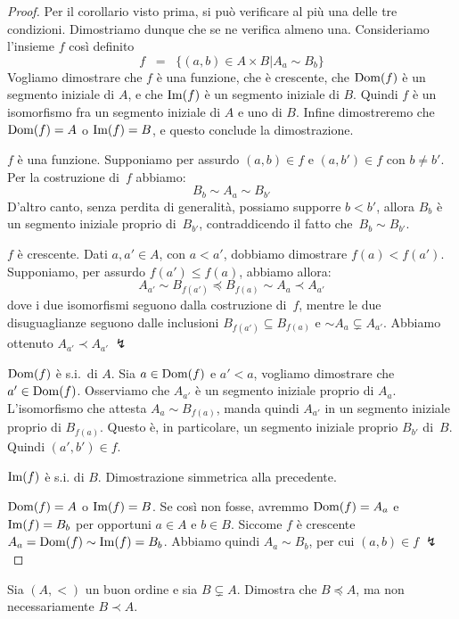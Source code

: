 \begin{proof}
	Per il corollario visto prima, si pu\`o verificare al pi\`u una
delle tre condizioni. Dimostriamo dunque che se ne verifica almeno una.
Consideriamo l'insieme $f$ cos\`i definito
	\[ f \;\;=\;\; \{(a,b) \in A \times B | A_a \sim B_b\}
		\]
	Vogliamo dimostrare che $f$ \`e una funzione, che \`e crescente,
che $\operatorname{Dom}(f)$ \`e un segmento iniziale di $A$, e che $\operatorname{Im}(f)$ \`e un
segmento iniziale di $B$. Quindi $f$ \`e un isomorfismo fra un segmento iniziale di $A$ e uno di $B$.
	Infine dimostreremo che $\operatorname{Dom}(f) = A$ o $\operatorname{Im}(f) = B$, e questo
conclude la dimostrazione.

{\drkblu $f$ \`e una funzione.} Supponiamo per assurdo $(a,b) \in f$ e
$(a,b') \in f$ con $b \ne b'$. Per la costruzione di~$f$ abbiamo:
		\[ B_b \sim A_a \sim B_{b'}
			\]
D'altro canto, senza perdita di generalit\`a, possiamo supporre $b < b'$, allora $B_b$ \`e un
segmento iniziale proprio di~$B_{b'}$, contraddicendo il fatto
che~$B_b\sim B_{b'}$.

{\drkblu $f$ \`e crescente.} Dati $a,a' \in A$, con $a<a'$, dobbiamo dimostrare $f(a) < f(a')$. Supponiamo, per assurdo $f(a') \leq f(a)$, abbiamo allora:
		\[ A_{a'} \sim B_{f(a')} \preceq B_{f(a)} \sim A_a \prec
A_{a'}
			\]
dove i due isomorfismi seguono dalla costruzione di~$f$, mentre le due
disuguaglianze seguono dalle inclusioni $B_{f(a')} \subseteq B_{f(a)}$ e
$\sim A_a\subsetneq  A_{a'}$.
Abbiamo ottenuto $A_{a'}\prec A_{a'}\;\lightning$

{\drkblu $\operatorname{Dom}(f)$ \`e s.i.\ di $A$.} Sia $a \in \operatorname{Dom}(f)$ e $a' < a$,
vogliamo dimostrare che $a' \in \operatorname{Dom}(f)$. Osserviamo che $A_{a'}$ \`e un
segmento iniziale proprio di $A_a$. L'isomorfismo che attesta $A_a\sim
B_{f(a)}$, manda quindi $A_{a'}$ in un segmento iniziale proprio di
$B_{f(a)}$. Questo \`e, in particolare, un segmento iniziale proprio
$B_{b'}$ di~$B$. Quindi $(a',b')\in f$.

{\drkblu $\operatorname{Im}(f)$ \`e s.i. di $B$.} Dimostrazione simmetrica alla precedente.

{\drkblu $\operatorname{Dom}(f) = A$ o $\operatorname{Im}(f) = B$.} Se cos\`i non fosse, avremmo $\operatorname{Dom}(f) = A_a$ e $\operatorname{Im}(f) = B_b$
		per opportuni $a \in A$ e $b \in B$. Siccome $f$ \`e
crescente $A_a = \operatorname{Dom}(f) \sim \operatorname{Im}(f) = B_b$.  Abbiamo quindi $A_a \sim
B_b$, per cui $(a,b)\in f\;\lightning$
\end{proof}

\begin{exercise}
	Sia $(A,<)$ un buon ordine e sia $B \subsetneq A$. Dimostra che $B \preceq A$, ma non necessariamente $B \prec A$.
\end{exercise}


